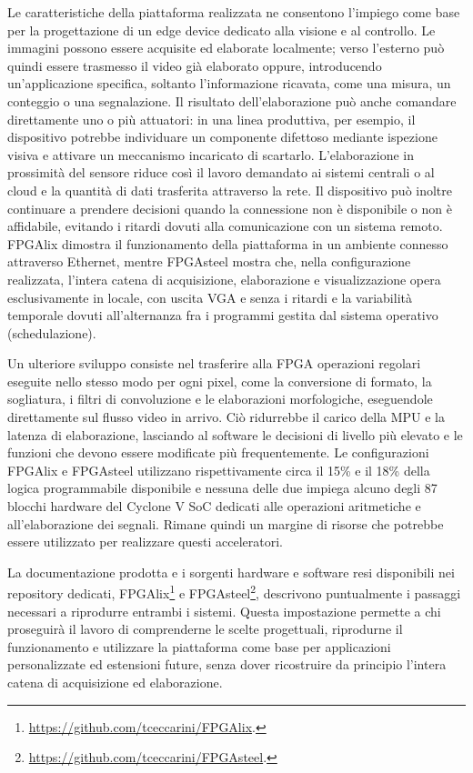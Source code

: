 Le caratteristiche della piattaforma realizzata ne consentono l'impiego come base per la progettazione di un edge device dedicato alla visione e al controllo. Le immagini possono essere acquisite ed elaborate localmente; verso l'esterno può quindi essere trasmesso il video già elaborato oppure, introducendo un'applicazione specifica, soltanto l'informazione ricavata, come una misura, un conteggio o una segnalazione. Il risultato dell'elaborazione può anche comandare direttamente uno o più attuatori: in una linea produttiva, per esempio, il dispositivo potrebbe individuare un componente difettoso mediante ispezione visiva e attivare un meccanismo incaricato di scartarlo. L'elaborazione in prossimità del sensore riduce così il lavoro demandato ai sistemi centrali o al cloud e la quantità di dati trasferita attraverso la rete. Il dispositivo può inoltre continuare a prendere decisioni quando la connessione non è disponibile o non è affidabile, evitando i ritardi dovuti alla comunicazione con un sistema remoto. FPGAlix dimostra il funzionamento della piattaforma in un ambiente connesso attraverso Ethernet, mentre FPGAsteel mostra che, nella configurazione realizzata, l'intera catena di acquisizione, elaborazione e visualizzazione opera esclusivamente in locale, con uscita VGA e senza i ritardi e la variabilità temporale dovuti all'alternanza fra i programmi gestita dal sistema operativo (schedulazione).

Un ulteriore sviluppo consiste nel trasferire alla FPGA operazioni regolari eseguite nello stesso modo per ogni pixel, come la conversione di formato, la sogliatura, i filtri di convoluzione e le elaborazioni morfologiche, eseguendole direttamente sul flusso video in arrivo. Ciò ridurrebbe il carico della MPU e la latenza di elaborazione, lasciando al software le decisioni di livello più elevato e le funzioni che devono essere modificate più frequentemente. Le configurazioni FPGAlix e FPGAsteel utilizzano rispettivamente circa il 15\% e il 18\% della logica programmabile disponibile e nessuna delle due impiega alcuno degli 87 blocchi hardware del Cyclone V SoC dedicati alle operazioni aritmetiche e all'elaborazione dei segnali. Rimane quindi un margine di risorse che potrebbe essere utilizzato per realizzare questi acceleratori.

La documentazione prodotta e i sorgenti hardware e software resi disponibili nei repository dedicati, FPGAlix\footnote{\url{https://github.com/tceccarini/FPGAlix}.} e FPGAsteel\footnote{\url{https://github.com/tceccarini/FPGAsteel}.}, descrivono puntualmente i passaggi necessari a riprodurre entrambi i sistemi. Questa impostazione permette a chi proseguirà il lavoro di comprenderne le scelte progettuali, riprodurne il funzionamento e utilizzare la piattaforma come base per applicazioni personalizzate ed estensioni future, senza dover ricostruire da principio l'intera catena di acquisizione ed elaborazione.


